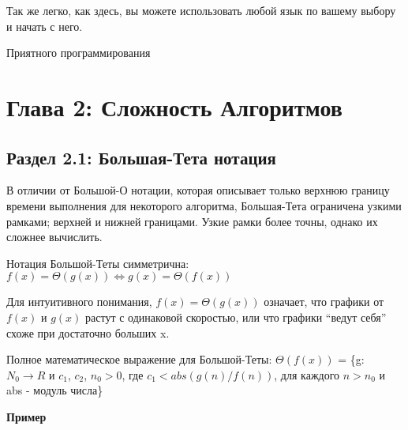 \vspace{\baselineskip}

Так же легко, как здесь, вы можете использовать любой язык по вашему выбору и начать с него.

\vspace{\baselineskip}

Приятного программирования

\chapter*{Глава 2: Сложность Алгоритмов}

\section*{Раздел 2.1: Большая-Тета нотация}

В отличии от Большой-О нотации, которая описывает только верхнюю границу времени выполнения для некоторого алгоритма, Большая-Тета ограничена узкими рамками; верхней и нижней границами. Узкие рамки более точны, однако их сложнее вычислить.

\vspace{\baselineskip}

Нотация Большой-Теты симметрична: $f(x) = \Theta(g(x)) \Leftrightarrow g(x) = \Theta(f(x))$

\vspace{\baselineskip}

Для интуитивного понимания, $f(x) = \Theta(g(x))$ означает, что графики от $f(x)$ и $g(x)$ растут с одинаковой скоростью, или что графики “ведут себя” схоже при достаточно больших x.

\vspace{\baselineskip}

Полное математическое выражение для Большой-Теты: $\Theta(f(x))$ = \{g: $N_0 \to R$ и $c_1$, $c_2$, $n_0 > 0$, где $c_1 < abs(g(n) / f(n))$, для каждого $n > n_0$ и abs - модуль числа\}

\vspace{\baselineskip}

\textbf{Пример}

\vspace{\baselineskip}

